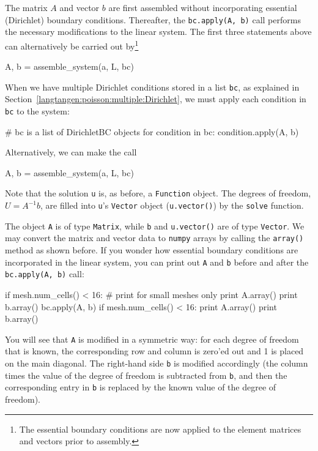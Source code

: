 The matrix $A$ and vector $b$ are first assembled without incorporating 
essential (Dirichlet) boundary conditions. Thereafter, the
{\fontsize{10pt}{10pt}\verb!bc.apply(A, b)!} call performs the necessary modifications to
the linear system. The first three statements above can alternatively
be carried out by\footnote{The essential boundary conditions are 
now applied to the element matrices and vectors prior to assembly.}
\begin{python}
A, b = assemble_system(a, L, bc)
\end{python}

When we have multiple Dirichlet conditions stored in a list {\fontsize{10pt}{10pt}\texttt{bc}}, 
as explained in
Section~\ref{langtangen:poisson:multiple:Dirichlet}, we must apply
each condition in {\fontsize{10pt}{10pt}\texttt{bc}} to the system:
\begin{python}
# bc is a list of DirichletBC objects
for condition in bc:
    condition.apply(A, b)
\end{python}
Alternatively, we can make the call
\begin{python}
A, b = assemble_system(a, L, bc)
\end{python}

Note that the solution {\fontsize{10pt}{10pt}\verb!u!} is, as before, a {\fontsize{10pt}{10pt}\verb!Function!} object.
The degrees of freedom, $U=A^{-1}b$, are filled
into {\fontsize{10pt}{10pt}\texttt{u}}'s {\fontsize{10pt}{10pt}\texttt{Vector}} object ({\fontsize{10pt}{10pt}\texttt{u.vector()}})
by the {\fontsize{10pt}{10pt}\verb!solve!} function.

The object {\fontsize{10pt}{10pt}\verb!A!} is of type {\fontsize{10pt}{10pt}\verb!Matrix!}, while {\fontsize{10pt}{10pt}\verb!b!} and
{\fontsize{10pt}{10pt}\verb!u.vector()!} are of type {\fontsize{10pt}{10pt}\verb!Vector!}. We may convert the
matrix and vector data to {\fontsize{10pt}{10pt}\verb!numpy!} arrays by calling the
{\fontsize{10pt}{10pt}\verb!array()!} method as shown before. If you wonder how essential
boundary conditions are incorporated in the linear system, you can
print out {\fontsize{10pt}{10pt}\texttt{A}} and {\fontsize{10pt}{10pt}\texttt{b}} before and after the
{\fontsize{10pt}{10pt}\texttt{bc.apply(A, b)}} call:
\begin{python}
if mesh.num_cells() < 16:  # print for small meshes only
    print A.array()
    print b.array()
bc.apply(A, b)
if mesh.num_cells() < 16:
    print A.array()
    print b.array()
\end{python}
You will see that {\fontsize{10pt}{10pt}\texttt{A}} is modified in a symmetric way:
for each degree of freedom that is known, the corresponding row
and column is zero'ed out and 1 is placed on the main diagonal.
The right-hand side {\fontsize{10pt}{10pt}\texttt{b}} is modified accordingly (the column times
the value of the degree of freedom is subtracted from {\fontsize{10pt}{10pt}\texttt{b}}, and
then the corresponding entry in {\fontsize{10pt}{10pt}\texttt{b}} is replaced by the known value
of the degree of freedom).

